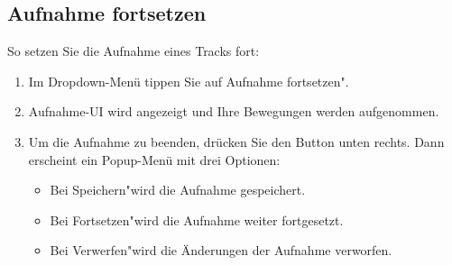 \documentclass{article}
\begin{document}
\subsection{Aufnahme fortsetzen}
	So setzen Sie die Aufnahme eines Tracks fort:
	\begin{enumerate}
		\item Im Dropdown-Menü tippen Sie auf \glqq Aufnahme fortsetzen".
		\item Aufnahme-UI wird angezeigt und Ihre Bewegungen werden aufgenommen.
		\item Um die Aufnahme zu beenden, drücken Sie den Button unten rechts. Dann erscheint ein Popup-Menü mit drei Optionen:
			\begin{itemize}
				\item Bei \glqq Speichern"\space wird die Aufnahme gespeichert.
				\item Bei \glqq Fortsetzen"\space wird die Aufnahme weiter fortgesetzt.
				\item Bei \glqq Verwerfen"\space wird die Änderungen der Aufnahme verworfen.
			\end{itemize}
	\end{enumerate}
\end{document}
